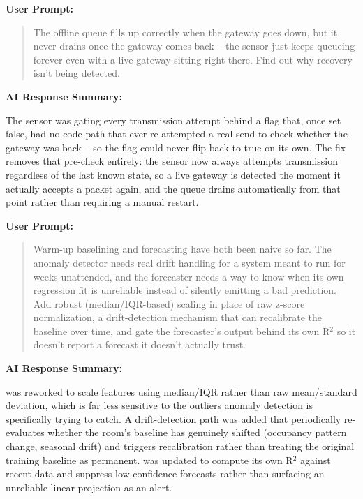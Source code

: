 \documentclass[conference]{IEEEtran}
\begin{document}
\noindent\textbf{User Prompt:}\par

\begin{quote}
The offline queue fills up correctly when the gateway goes down, but it never drains once the gateway comes back -- the sensor just keeps queueing forever even with a live gateway sitting right there. Find out why recovery isn't being detected.
\end{quote}

\noindent\textbf{AI Response Summary:}\par

The sensor was gating every transmission attempt behind a \texttt{} flag that, once set false, had no code path that ever re-attempted a real send to check whether the gateway was back -- so the flag could never flip back to true on its own. The fix removes that pre-check entirely: the sensor now always attempts transmission regardless of the last known state, so a live gateway is detected the moment it actually accepts a packet again, and the queue drains automatically from that point rather than requiring a manual restart.

\par\vspace{4pt}\par\vspace{2pt}

\noindent\textbf{User Prompt:}\par

\begin{quote}
Warm-up baselining and forecasting have both been naive so far. The anomaly detector needs real drift handling for a system meant to run for weeks unattended, and the forecaster needs a way to know when its own regression fit is unreliable instead of silently emitting a bad prediction. Add robust (median/IQR-based) scaling in place of raw z-score normalization, a drift-detection mechanism that can recalibrate the baseline over time, and gate the forecaster's output behind its own R$^2$ so it doesn't report a forecast it doesn't actually trust.
\end{quote}

\noindent\textbf{AI Response Summary:}\par

\texttt{} was reworked to scale features using median/IQR rather than raw mean/standard deviation, which is far less sensitive to the outliers anomaly detection is specifically trying to catch. A drift-detection path was added that periodically re-evaluates whether the room's baseline has genuinely shifted (occupancy pattern change, seasonal drift) and triggers recalibration rather than treating the original training baseline as permanent. \texttt{} was updated to compute its own R$^2$ against recent data and suppress low-confidence forecasts rather than surfacing an unreliable linear projection as an alert.
\end{document}
